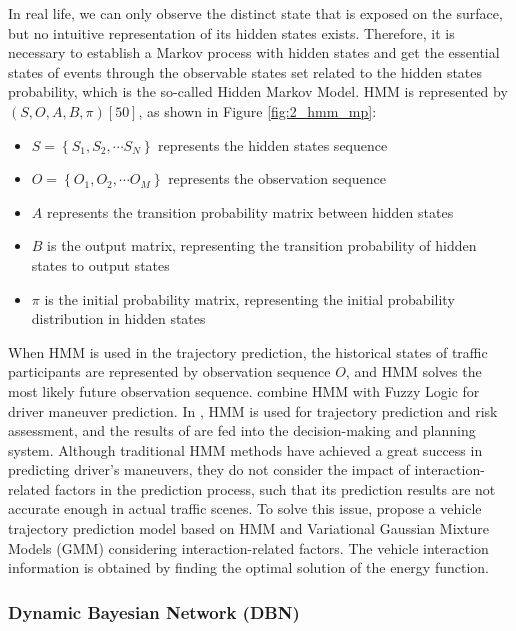 In real life, we can only observe the distinct state that is exposed on the surface, but no intuitive representation of its hidden states exists. Therefore, it is necessary to establish a Markov process with hidden states and get the essential states of events through the observable states set related to the hidden states probability, which is the so-called Hidden Markov Model. HMM is represented by $(S, O, A, B, \pi)[50]$, as shown in Figure \ref{fig:2_hmm_mp}:

\begin{itemize}
	\item $S=\left\{S_1, S_2, \cdots S_N\right\}$ represents the hidden states sequence
	\item $O=\left\{O_1, O_2, \cdots O_M\right\}$ represents the observation sequence
	\item $A$ represents the transition probability matrix between hidden states
	\item $B$ is the output matrix, representing the transition probability of hidden states to output states
	\item $\pi$ is the initial probability matrix, representing the initial probability distribution in hidden states
\end{itemize}

When HMM is used in the trajectory prediction, the historical states of traffic participants are represented by observation sequence $O$, and HMM solves the most likely future observation sequence. \cite{deng2018improved} combine HMM with Fuzzy Logic for driver maneuver prediction. In \cite{wang2021decision}, HMM is used for trajectory prediction and risk assessment, and the results of are fed into the decision-making and planning system. Although traditional HMM methods have achieved a great success in predicting driver’s maneuvers, they do not consider the impact of interaction-related factors in the prediction process, such that its prediction results are not accurate enough in actual traffic scenes. To solve this issue, \cite{deo2018would} propose a vehicle trajectory prediction model based on HMM and Variational Gaussian Mixture Models (GMM) considering interaction-related factors. The vehicle interaction information is obtained by finding the optimal solution of the energy function.

\subsubsection{Dynamic Bayesian Network (DBN)}
\label{subsubsec:2_dbn_mp}


